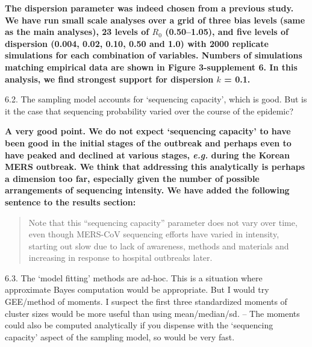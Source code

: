 \documentclass[11pt,oneside,letterpaper]{article}
\begin{document}
\textbf{The dispersion parameter was indeed chosen from a previous study. We have run small scale analyses over a grid of three bias levels (same as the main analyses), 23 levels of $R_{0}$ (0.50--1.05), and five levels of dispersion (0.004, 0.02, 0.10, 0.50 and 1.0) with 2000 replicate simulations for each combination of variables. Numbers of simulations matching empirical data are shown in Figure 3-supplement 6. In this analysis, we find strongest support for dispersion $k$ = 0.1.}

6.2. The sampling model accounts for `sequencing capacity', which is good. But is it the case that sequencing probability varied over the course of the epidemic?

\textbf{A very good point. We do not expect `sequencing capacity' to have been good in the initial stages of the outbreak and perhaps even to have peaked and declined at various stages, \textit{e.g.} during the Korean MERS outbreak. We think that addressing this analytically is perhaps a dimension too far, especially given the number of possible arrangements of sequencing intensity. We have added the following sentence to the results section:}

\begin{quotation}
Note that this ``sequencing capacity'' parameter does not vary over time, even though MERS-CoV sequencing efforts have varied in intensity, starting out slow due to lack of awareness, methods and materials and increasing in response to hospital outbreaks later.
\end{quotation}

6.3. The `model fitting' methods are ad-hoc. This is a situation where approximate Bayes computation would be appropriate. But I would try GEE/method of moments. I suspect the first three standardized moments of cluster sizes would be more useful than using mean/median/sd. -- The moments could also be computed analytically if you dispense with the `sequencing capacity' aspect of the sampling model, so would be very fast.
\end{document}
